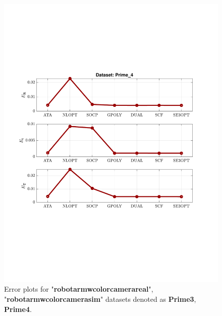 \begin{figure}
\includegraphics[scale=0.7]{./hand_eye_figures/real/adv_Result_Prime_4}
\caption{Error plots for "\textbf{robot{\textunderscore}arm{\textunderscore}w{\textunderscore}color{\textunderscore}camera{\textunderscore}real}", "\textbf{robot{\textunderscore}arm{\textunderscore}w{\textunderscore}color{\textunderscore}camera{\textunderscore}sim}" datasets denoted as \textbf{Prime{\textunderscore}3}, \textbf{Prime{\textunderscore}4}.}
\end{figure}

